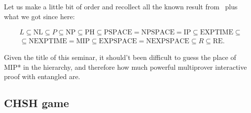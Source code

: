 Let us make a little bit of order and recollect all the known result from~\cite{papadimitriou1994computational} plus what we got since here:

\begin{equation}
\begin{split}
    &L \subseteq \text{NL} \subseteq P \subseteq \text{NP} \subseteq \text{PH} \subseteq \text{PSPACE} = \text{NPSPACE} = \text{IP} \subseteq \text{EXPTIME} \subseteq  \\
    &\subseteq \text{NEXPTIME} = \text{MIP} \subseteq \text{EXPSPACE} = \text{NEXPSPACE} \subseteq R \subseteq \text{RE}.
\end{split}
\end{equation}

Given the title of this seminar, it should't been difficult to guess the place of MIP* in the hierarchy, and therefore how much powerful multiprover interactive proof with entangled are.

\subsection{CHSH game}
